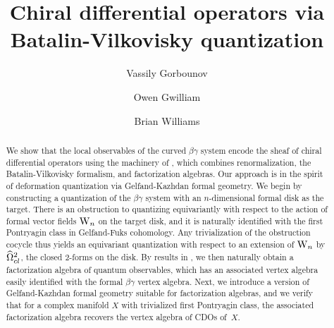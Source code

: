 \documentclass[10pt]{amsart}
\title{Chiral differential operators via\\Batalin-Vilkovisky quantization}
\author{Vassily Gorbounov}
\author{Owen Gwilliam}
\author{Brian Williams}
\begin{document}
\maketitle

\begin{abstract}
We show that the local observables of the curved $\beta\gamma$ system
encode the sheaf of chiral differential operators using the machinery of \cite{CG}, 
which combines renormalization, the Batalin-Vilkovisky formalism, and factorization algebras. 
Our approach is in the spirit of deformation quantization via Gelfand-Kazhdan formal geometry.
We begin by constructing a quantization of the $\beta\gamma$ system with an $n$-dimensional formal disk as the target. There is an obstruction to quantizing equivariantly with respect to the action of formal vector fields ${{\rm W}_n}$ on the target disk, and it is naturally identified with the first Pontryagin class in Gelfand-Fuks cohomology.
Any trivialization of the obstruction cocycle thus yields an equivariant quantization with respect to an extension of ${{\rm W}_n}$ by $\widehat{\Omega}^2_{cl}$, the closed 2-forms on the disk. By results in \cite{CG}, we then naturally obtain a factorization algebra of quantum observables, which has an associated vertex algebra easily identified with the formal $\beta\gamma$ vertex algebra. Next, we introduce a version of Gelfand-Kazhdan formal geometry suitable for factorization algebras, and we verify that for a complex manifold $X$ with trivialized first Pontryagin class, the associated factorization algebra recovers the vertex algebra of CDOs of~$X$.\\
\end{abstract}


\tableofcontents







\end{document}
